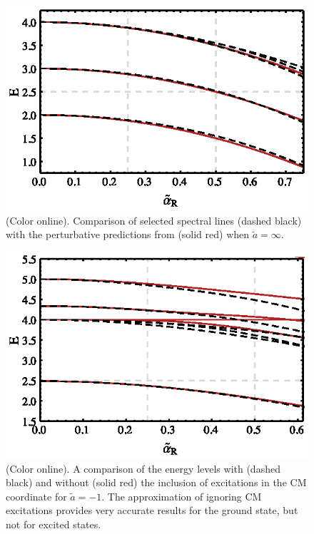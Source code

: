 \documentclass[%
 notitlepage,
 preprint,
showpacs,%
 amsmath,amssymb,
 aps,
pra,
]{revtex4-1}
\begin{document}
\begin{figure}
\includegraphics{Figures/PerturbativeComparison}
\caption{\label{fig:ComparisonSpectrum}(Color online).  Comparison of selected spectral lines (dashed black) with the perturbative predictions from \cite{PhysRevA.89.033606} (solid red) when $\tilde{a}=\infty$. }
\end{figure}

\begin{figure}
\includegraphics{Figures/ComparisonNoCM}
\caption{\label{fig:ComparisonSpectrum2}(Color online).  A comparison of the energy levels with (dashed black) and without (solid red) the inclusion of excitations in the CM coordinate for $\tilde{a}=-1$. The approximation of ignoring CM excitations provides very accurate results for the ground state, but not for excited states.} 
\end{figure}
\end{document}
